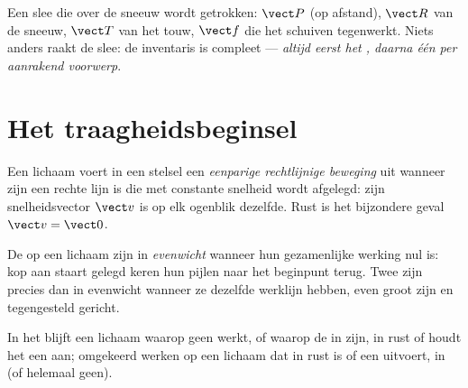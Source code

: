\begin{example}\label{ex:g10:inertia:sled}
Een slee die over de sneeuw wordt getrokken:  $\vect P$ (op
afstand),  $\vect R$ van de sneeuw,  $\vect T$ van
het touw,  $\vect f$ die het schuiven tegenwerkt. Niets anders
raakt de slee: de inventaris is compleet --- \emph{altijd eerst het
, daarna één  per aanrakend voorwerp}.
\end{example}

\section{Het traagheidsbeginsel}

\begin{definition}\label{def:g10:inertia:uniform}
Een lichaam voert in een stelsel een \emph{eenparige rechtlijnige
beweging} uit wanneer zijn 
een rechte lijn is die met constante snelheid wordt afgelegd: zijn
snelheidsvector $\vect v$ is op elk ogenblik dezelfde. Rust is het
bijzondere geval $\vect v = \vect 0$.
\end{definition}

\begin{definition}\label{def:g10:inertia:compensate}
De  op een lichaam zijn in \emph{evenwicht}
wanneer hun gezamenlijke werking nul is: kop aan staart gelegd keren hun
pijlen naar het beginpunt terug. Twee  zijn precies dan in
evenwicht wanneer ze dezelfde werklijn hebben, even groot zijn en
tegengesteld gericht.
\end{definition}

\begin{theorem}[Traagheidsbeginsel]\label{thm:g10:inertia:principle}
In het  blijft een lichaam waarop geen 
werkt, of waarop de  in  zijn, in rust of houdt het een
 aan; omgekeerd werken op een lichaam dat
in rust is of een  uitvoert,  in
 (of helemaal geen).
\end{theorem}
\admitted

